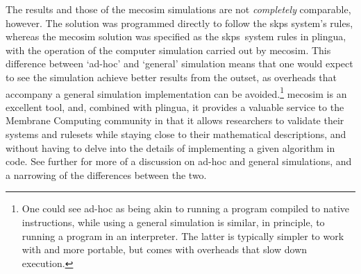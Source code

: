 The \fsharp{} results and those of the \gls{mecosim} simulations are not \emph{completely} comparable, however.  The \fsharp{} solution was programmed directly to follow the \gls{skps} system's rules, whereas the \gls{mecosim} solution was specified as the \gls{skps}~system rules in \gls{plingua}, with the operation of the computer simulation carried out by \gls{mecosim}.  This difference between `ad-hoc' and `general' simulation means that one would expect to see the \fsharp{} simulation achieve better results from the outset, as overheads that accompany a general simulation implementation can be avoided.\footnote{One could see ad-hoc as being akin to running a program compiled to native instructions, while using a general simulation is similar, in principle, to running a program in an interpreter.  The latter is typically simpler to work with and more portable, but comes with overheads that slow down execution.}  \Gls{mecosim} is an excellent tool, and, combined with \gls{plingua}, it provides a valuable service to the Membrane Computing community in that it allows researchers to validate their systems and rulesets while staying close to their mathematical descriptions, and without having to delve into the details of implementing a given algorithm in code.  See further \cite{Perez-Hurtado2019} for more of a discussion on ad-hoc and general simulations, and a narrowing of the differences between the two.